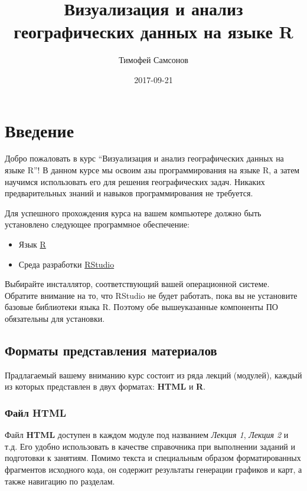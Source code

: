 \documentclass[]{book}
\title{Визуализация и анализ географических данных на языке R}
\author{Тимофей Самсонов}
\date{2017-09-21}
\providecommand{\tightlist}{%
  \setlength{\itemsep}{0pt}\setlength{\parskip}{0pt}}
\begin{document}
\maketitle

{
\setcounter{tocdepth}{1}
\tableofcontents
}
\chapter*{Введение}

Добро пожаловать в курс ``Визуализация и анализ географических данных на
языке R''! В данном курсе мы освоим азы программирования на языке R, а
затем научимся использовать его для решения географических задач.
Никаких предварительных знаний и навыков программирования не требуется.

Для успешного прохождения курса на вашем компьютере должно быть
установлено следующее программное обеспечение:

\begin{itemize}
\tightlist
\item
  Язык \href{https://cran.r-project.org}{R}
\item
  Среда разработки
  \href{https://www.rstudio.com/products/rstudio/download3/}{RStudio}
\end{itemize}

Выбирайте инсталлятор, соответствующий вашей операционной системе.
Обратите внимание на то, что RStudio не будет работать, пока вы не
установите базовые библиотеки языка R. Поэтому обе вышеуказанные
компоненты ПО обязательны для установки.

\section*{Форматы представления материалов}\label{--}

Прадлагаемый вашему вниманию курс состоит из ряда лекций (модулей),
каждый из которых представлен в двух форматах: \textbf{HTML} и
\textbf{R}.

\subsection*{Файл HTML}\label{-html}

Файл \textbf{HTML} доступен в каждом модуле под названием \emph{Лекция
1}, \emph{Лекция 2} и т.д. Его удобно использовать в качестве
справочника при выполнении заданий и подготовки к занятиям. Помимо
текста и специальным образом форматированных фрагментов исходного кода,
он содержит результаты генерации графиков и карт, а также навигацию по
разделам.
\end{document}

